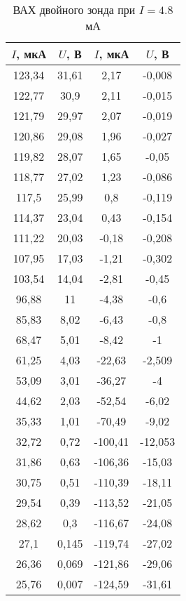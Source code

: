 \begin{table}[h!]
    \centering
    \begin{tabular}{|c|c|c|c|}
        \hline
        $I$, мкА & $U$, В & $I$, мкА & $U$, В    \\ \hline
        123,34   & 31,61  & 2,17     & -0,008    \\ \hline
        122,77   & 30,9   & 2,11     & -0,015    \\ \hline
        121,79   & 29,97  & 2,07     & -0,019    \\ \hline
        120,86   & 29,08  & 1,96     & -0,027    \\ \hline
        119,82   & 28,07  & 1,65     & -0,05     \\ \hline
        118,77   & 27,02  & 1,23     & -0,086    \\ \hline
        117,5    & 25,99  & 0,8      & -0,119    \\ \hline
        114,37   & 23,04  & 0,43     & -0,154    \\ \hline
        111,22   & 20,03  & -0,18    & -0,208    \\ \hline
        107,95   & 17,03  & -1,21    & -0,302    \\ \hline
        103,54   & 14,04  & -2,81    & -0,45     \\ \hline
        96,88    & 11     & -4,38    & -0,6      \\ \hline
        85,83    & 8,02   & -6,43    & -0,8      \\ \hline
        68,47    & 5,01   & -8,42    & -1        \\ \hline
        61,25    & 4,03   & -22,63   & -2,509    \\ \hline
        53,09    & 3,01   & -36,27   & -4        \\ \hline
        44,62    & 2,03   & -52,54   & -6,02     \\ \hline
        35,33    & 1,01   & -70,49   & -9,02     \\ \hline
        32,72    & 0,72   & -100,41  & -12,053   \\ \hline
        31,86    & 0,63   & -106,36  & -15,03    \\ \hline
        30,75    & 0,51   & -110,39  & -18,11    \\ \hline
        29,54    & 0,39   & -113,52  & -21,05    \\ \hline
        28,62    & 0,3    & -116,67  & -24,08    \\ \hline
        27,1     & 0,145  & -119,74  & -27,02    \\ \hline
        26,36    & 0,069  & -121,86  & -29,06    \\ \hline
        25,76    & 0,007  & -124,59  & -31,61    \\ \hline
    \end{tabular}
    \caption{ВАХ двойного зонда при $I = 4.8$ мА}
    \label{VAC2}
\end{table}